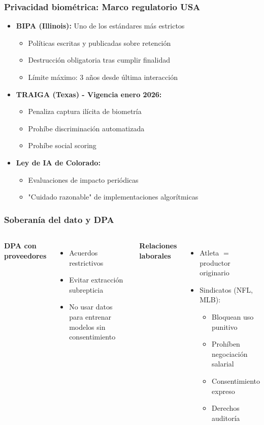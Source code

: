 \documentclass[aspectratio=169]{beamer}
\begin{document}
\begin{frame}\frametitle{Privacidad biométrica: Marco regulatorio USA}
\begin{itemize}
    \item \textbf{BIPA (Illinois):} Uno de los estándares más estrictos
    \begin{itemize}
        \item Políticas escritas y publicadas sobre retención
        \item Destrucción obligatoria tras cumplir finalidad
        \item Límite máximo: 3 años desde última interacción
    \end{itemize}
    \item \textbf{TRAIGA (Texas) - Vigencia enero 2026:}
    \begin{itemize}
        \item Penaliza captura ilícita de biometría
        \item Prohíbe discriminación automatizada
        \item Prohíbe social scoring
    \end{itemize}
    \item \textbf{Ley de IA de Colorado:}
    \begin{itemize}
        \item Evaluaciones de impacto periódicas
        \item "Cuidado razonable" de implementaciones algorítmicas
    \end{itemize}
\end{itemize}
\end{frame}

\begin{frame}\frametitle{Soberanía del dato y DPA}
\begin{columns}[T]
\textbf{DPA con proveedores}
\begin{itemize}
    \item Acuerdos restrictivos
    \item Evitar extracción subrepticia
    \item No usar datos para entrenar modelos sin consentimiento
\end{itemize}

\textbf{Relaciones laborales}
\begin{itemize}
    \item Atleta $=$ productor originario
    \item Sindicatos (NFL, MLB):
    \begin{itemize}
        \item Bloquean uso punitivo
        \item Prohíben negociación salarial
        \item Consentimiento expreso
        \item Derechos auditoría
    \end{itemize}
\end{itemize}
\end{columns}
\end{frame}
\end{document}

